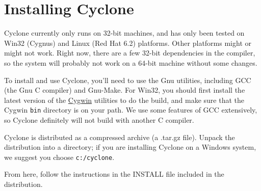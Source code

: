 \section{Installing Cyclone}
\label{sec:install}
Cyclone currently only runs on 32-bit machines, and has only been
tested on Win32 (Cygnus) and Linux (Red Hat 6.2) platforms.  Other
platforms might or might not work.  Right now, there are a few 32-bit
dependencies in the compiler, so the system will probably not work on
a 64-bit machine without some changes.

To install and use Cyclone, you'll need to use the Gnu utilities,
including GCC (the Gnu C compiler) and Gnu-Make.  For Win32, you
should first install the latest version of the
\href{http://cygwin.com/}{Cygwin} utilities to do the build, and make
sure that the Cygwin \texttt{bin} directory is on your path. We use
some features of GCC extensively, so Cyclone definitely will not build
with another C compiler.

Cyclone is distributed as a compressed archive (a .tar.gz file).
Unpack the distribution into a directory; if you are installing
Cyclone on a Windows system, we suggest you choose
\texttt{c:/cyclone}.

From here, follow the instructions in the INSTALL file included in the
distribution.






